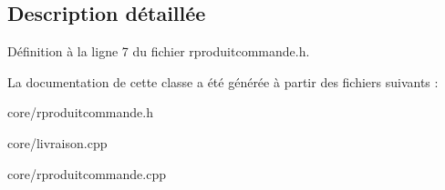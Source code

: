 \subsection{Description détaillée}


Définition à la ligne 7 du fichier rproduitcommande.h.



La documentation de cette classe a été générée à partir des fichiers suivants :\begin{DoxyCompactItemize}
\item 
core/rproduitcommande.h\item 
core/livraison.cpp\item 
core/rproduitcommande.cpp\end{DoxyCompactItemize}
